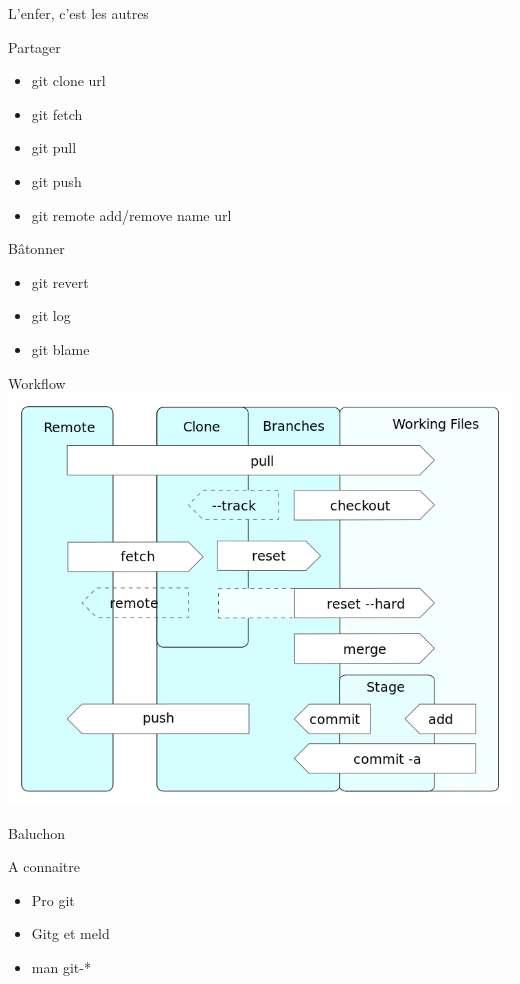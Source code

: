 \documentclass[xcolor=svgnames,12pt]{beamer}
\begin{document}
\begin{frame}{L'enfer, c'est les autres}
    \begin{block}{Partager}
        \begin{itemize}
            \item git clone url
            \item git fetch
            \item git pull
            \item git push
            \item git remote add/remove name url
        \end{itemize}
    \end{block}
    \pause
    \begin{block}{Bâtonner}
        \begin{itemize}
            \item git revert
            \item git log
            \item git blame
        \end{itemize}
    \end{block}
\end{frame}

\begin{frame}{Workflow}
    \includegraphics[width=.7\paperwidth]{flow.png}
\end{frame}

\begin{frame}{Baluchon}
    \begin{block}{A connaitre}
    \begin{itemize}
        \item Pro git
        \item Gitg et meld
        \item man git-*
    \end{itemize}
    \end{block}
\end{frame}
\end{document}

